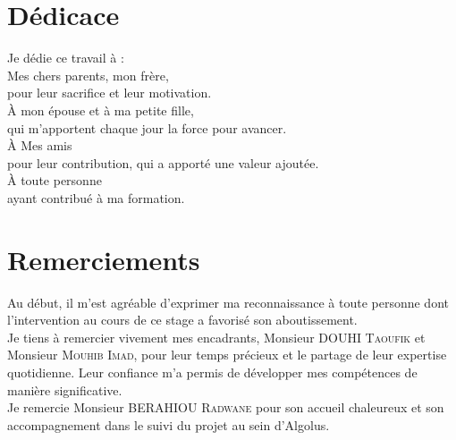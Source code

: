 \documentclass[12pt,a4paper]{report}
\begin{document}
	\pagestyle{empty} 
	
	\chapter*{Dédicace}
	
	\begin{center}
		\begin{minipage}{0.8\textwidth} %
			\centering
			\Large\itshape %
			
			Je dédie ce travail à :\\[1.5em] %
			
			Mes chers parents, mon frère,  \\
			pour leur sacrifice et leur motivation.\\[1em]
			
			À mon épouse et à ma petite fille,  \\
			qui m’apportent chaque jour la force pour avancer.\\[1em]
			
			À Mes amis \\
			pour leur contribution, qui a apporté une valeur ajoutée.\\[1em]
			
			À toute personne \\
			ayant contribué à ma formation.
			
		\end{minipage}
	\end{center}
	\thispagestyle{empty}
	
	\chapter*{Remerciements}
			
	Au début, il m'est agréable d'exprimer ma reconnaissance à toute personne dont l'intervention au cours de ce stage a favorisé son aboutissement.\\
			
	Je tiens à remercier vivement mes encadrants, Monsieur \textsc{DOUHI Taoufik} et Monsieur \textsc{Mouhib Imad}, pour leur temps précieux et le partage de leur expertise quotidienne. Leur confiance m'a permis de développer mes compétences de manière significative.\\[0.6em]
				
	Je remercie Monsieur \textsc{BERAHIOU Radwane} pour son accueil chaleureux et son accompagnement dans le suivi du projet au sein d'Algolus.\\[0.6em]
				
\end{document}
